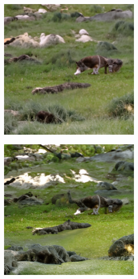 \documentclass{article}
\begin{document}
\begin{figure}
    \begin{subfigure}[b]{0.19\linewidth}
    \includegraphics[width=\linewidth]{figures/imagenet256/solver_samples/imagenet256_fm_ot_16_05.png}
    \end{subfigure}
    \begin{subfigure}[b]{0.19\linewidth}
    \includegraphics[width=\linewidth]{figures/imagenet256/solver_samples/imagenet256_fm_ot_16_10.png}

\end{subfigure}
\end{figure}
\end{document}
